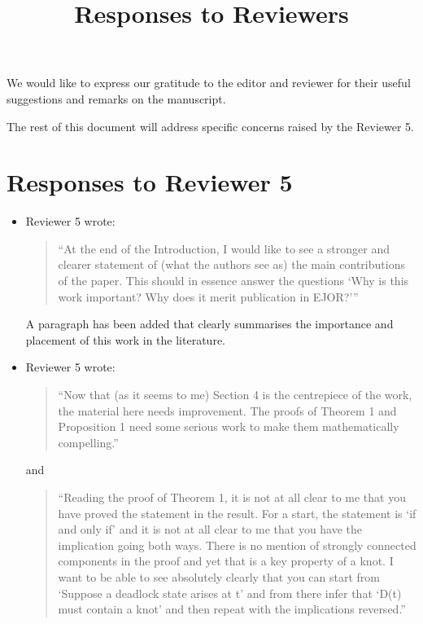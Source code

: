 \documentclass{article}
\title{Responses to Reviewers}
\author{}
\date{}
\begin{document}
\maketitle

We would like to express our gratitude to the editor and reviewer for their
useful suggestions and remarks on the manuscript.

The rest of this document will address specific concerns raised by the Reviewer
5.

\section*{Responses to Reviewer 5}

\begin{itemize}

\item Reviewer 5 wrote:
\begin{quote}
``At the end of the Introduction, I would like to see a stronger and clearer
statement of (what the authors see as) the main contributions of the paper.
This should in essence answer the questions ‘Why is this work important? Why
does it merit publication in EJOR?’''
\end{quote}

A paragraph has been added that clearly summarises the importance and placement
of this work in the literature.

\item Reviewer 5 wrote:
\begin{quote}
``Now that (as it seems to me) Section 4 is the centrepiece of the work, the
material here needs improvement. The proofs of Theorem 1 and Proposition 1 need
some serious work to make them mathematically compelling.''
\end{quote}

and

\begin{quote}
``Reading the proof of Theorem 1, it is not at all clear to me that you have
proved the statement in the result. For a start, the statement is ‘if and only
if’ and it is not at all clear to me that you have the implication going both
ways. There is no mention of strongly connected components in the proof and yet
that is a key property of a knot. I want to be able to see absolutely clearly
that you can start from ‘Suppose a deadlock state arises at t’ and from there
infer that ‘D(t) must contain a knot’ and then repeat with the implications
reversed.''
\end{quote}


\end{itemize}
\end{document}
